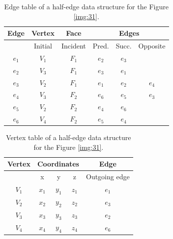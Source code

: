 \begin{table}[]\centering
    \begin{tabular}{|c|c|c|ccc|}
    \hline
    \hline
    Edge  & Vertex       & Face        & \multicolumn{3}{c|}{Edges}                            \\ \hline
          & Initial      & Incident    & Pred.            & Succ.           & Opposite         \\ \hline\hline
    $e_1$ & $V_1$        & $F_1$       & $e_2$            & $e_3$           &                  \\ \hline
    $e_2$ & $V_3$        & $F_1$       & $e_3$            & $e_1$           &                  \\ \hline
    $e_3$ & $V_2$        & $F_1$       & $e_1$            & $e_2$           & $e_4$            \\ \hline
    $e_4$ & $V_3$        & $F_2$       & $e_6$            & $e_5$           & $e_3$            \\ \hline
    $e_5$ & $V_2$        & $F_2$       & $e_4$            & $e_6$           &                  \\ \hline
    $e_6$ & $V_4$        & $F_2$       & $e_5$            & $e_4$           &                  \\ \hline\hline
    
    \end{tabular}
\caption{Edge table of a half-edge data structure for the Figure \ref{img:31}.}
\label{tab:5}
\end{table}

\begin{table}[]
    \centering
    \begin{tabular}{|c|ccc|c|}
    \hline
    \hline
    Vertex  & \multicolumn{3}{c|}{Coordinates}          & Edge            \\ \hline
          & x            & y            & z           & Outgoing edge   \\ \hline\hline
    $V_1$ & $x_1$        & $y_1$        & $z_1$       & $e_1$           \\ \hline
    $V_2$ & $x_2$        & $y_2$        & $z_2$       & $e_3$           \\ \hline
    $V_3$ & $x_3$        & $y_3$        & $z_3$       & $e_2$           \\ \hline
    $V_4$ & $x_4$        & $y_4$        & $z_4$       & $e_6$           \\ \hline\hline
    \end{tabular}
\caption{Vertex table of a half-edge data structure for the Figure \ref{img:31}.}
\label{tab:6}
\end{table}

